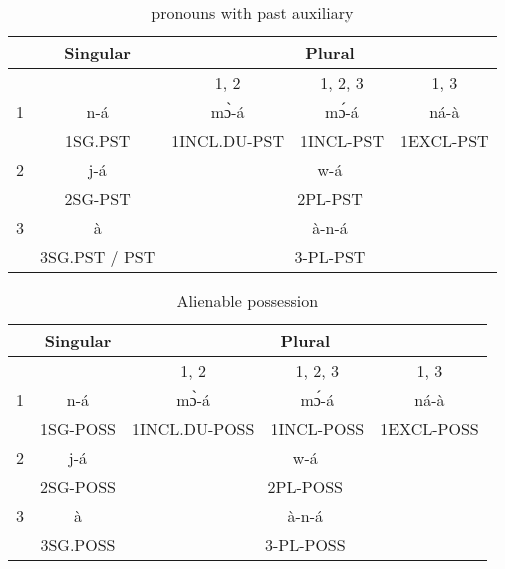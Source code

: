 \documentclass[12pt]{assets/fieldnotes}
\begin{document}
\begin{table}[htb!]
    \centering
    \begin{tabular}{ccccc}
        \toprule
        & Singular & \multicolumn{3}{c}{Plural} \\
        \toprule 
        & & 1, 2 & 1, 2, 3 & 1, 3 \\  
        \cmidrule(r){3-3}
        \cmidrule(r){4-4} 
        \cmidrule(r){5-5}
        1 & n-á & mɔ̀-á & mɔ́-á & ná-à \\
        & 1SG.PST & 1INCL.DU-PST & 1INCL-PST & 1EXCL-PST\\
        \midrule
        2 & j-á & \multicolumn{3}{c}{w-á} \\
          & 2SG-PST & \multicolumn{3}{c}{2PL-PST} \\
        \midrule
        3 & à & \multicolumn{3}{c}{à-n-á}\\
        & 3SG.PST / PST & \multicolumn{3}{c}{3-PL-PST} \\
        \bottomrule
    \end{tabular}
    \caption{pronouns with past auxiliary}
    \label{tab:fut}
\end{table}
\begin{table}[htb!]
    \centering
    \begin{tabular}{ccccc}
        \toprule
        & Singular & \multicolumn{3}{c}{Plural} \\
        \toprule 
        & & 1, 2 & 1, 2, 3 & 1, 3 \\  
        \cmidrule(r){3-3}
        \cmidrule(r){4-4} 
        \cmidrule(r){5-5}
        1 & n-á & mɔ̀-á & mɔ́-á & ná-à \\
        & 1SG-POSS & 1INCL.DU-POSS & 1INCL-POSS & 1EXCL-POSS\\
        \midrule
        2 & j-á & \multicolumn{3}{c}{w-á} \\
          & 2SG-POSS & \multicolumn{3}{c}{2PL-POSS} \\
        \midrule
        3 & à & \multicolumn{3}{c}{à-n-á}\\
        & 3SG.POSS & \multicolumn{3}{c}{3-PL-POSS} \\
        \bottomrule
    \end{tabular}
    \caption{Alienable possession}
    \label{tab:fut}
\end{table}
\end{document}
